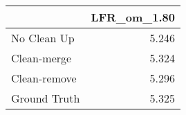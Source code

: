 \begin{tabular}{lr}
\toprule
{} & LFR_om_1.80 \\
\midrule
No Clean Up  &       5.246 \\
Clean-merge  &       5.324 \\
Clean-remove &       5.296 \\
Ground Truth &       5.325 \\
\bottomrule
\end{tabular}
